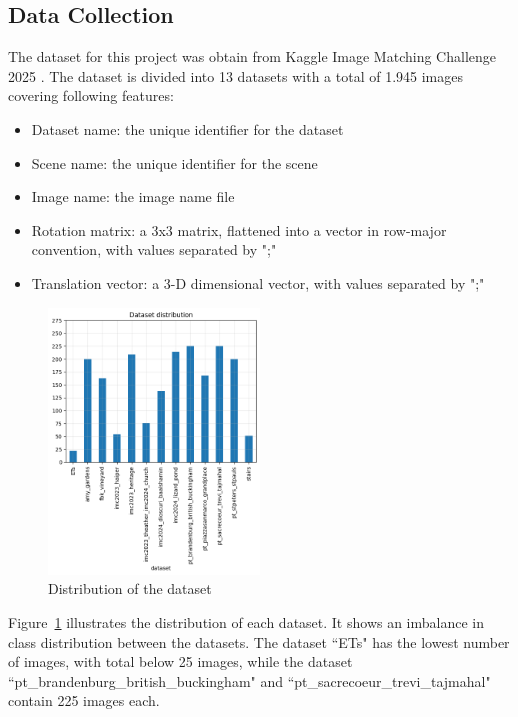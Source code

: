 \documentclass[report.tex]{subfiles}
\begin{document}
    \subsection{Data Collection}
    The dataset for this project was obtain from Kaggle Image Matching Challenge 2025 \cite{image-matching-challenge-2025}. The dataset is divided into 13 datasets with a total of 1.945 images covering following features:
    \begin{itemize}
        \item Dataset name: the unique identifier for the dataset
        \item Scene name: the unique identifier for the scene
        \item Image name: the image name file
        \item Rotation matrix: a 3x3 matrix, flattened into a vector in row-major convention, with values separated by ";"
        \item Translation vector: a 3-D dimensional vector, with values separated by ";"
    \end{itemize}

    \begin{figure}[htbp]
        \centering
        \includegraphics[width = 0.5\textwidth]{images/dataset_distribution.png}
        \caption{Distribution of the dataset}
        \label{fig:dataset-distribution}
    \end{figure}
   

    Figure~\ref{fig:dataset-distribution} illustrates the distribution of each dataset. It shows an imbalance in class distribution between the datasets. The dataset ``ETs" has the lowest number of images, with total below 25 images, while the dataset ``pt\_brandenburg\_british\_buckingham" and ``pt\_sacrecoeur\_trevi\_tajmahal" contain 225 images each.
    
\end{document}
